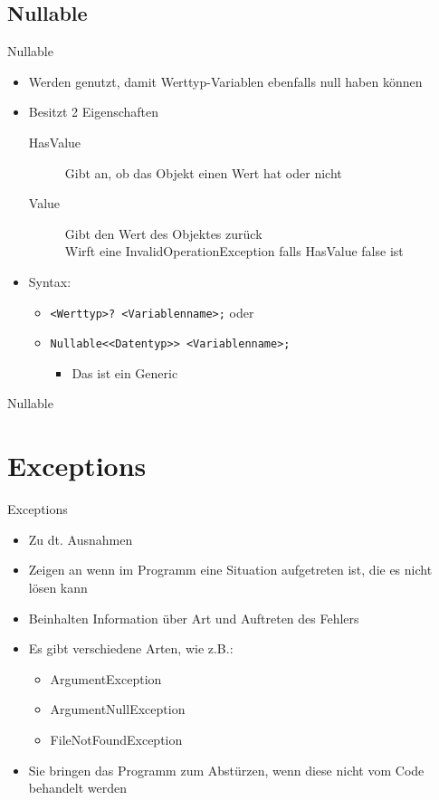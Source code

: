 \subsection{Nullable}
\begin{frame}{Nullable}
	\begin{itemize}
		\item Werden genutzt, damit Werttyp-Variablen ebenfalls \alert{null} haben können
		\item Besitzt 2 Eigenschaften
		\begin{description}
			\item[HasValue] Gibt an, ob das Objekt einen Wert hat oder nicht
			\item[Value] Gibt den Wert des Objektes zurück\\ Wirft eine InvalidOperationException falls HasValue false ist 
		\end{description}
		\item Syntax:
		\begin{itemize}
			\item \texttt{\alert{<Werttyp>}? \alert{<Variablenname>};} oder
			\item \texttt{Nullable<\alert{<Datentyp>}> \alert{<Variablenname>};}
			\begin{itemize}
				\item Das ist ein Generic
			\end{itemize}
		\end{itemize}
	\end{itemize}
\end{frame}

\begin{frame}{Nullable}
		
\end{frame}

\section{Exceptions}
\begin{frame}{Exceptions}
	\begin{itemize}
		\item Zu dt. Ausnahmen
		\item Zeigen an wenn im Programm eine Situation aufgetreten ist, die es nicht lösen kann
		\item Beinhalten Information über Art und Auftreten des Fehlers
		\item Es gibt verschiedene Arten, wie z.B.:
		\begin{itemize} 
			\item ArgumentException
			\item ArgumentNullException	
			\item FileNotFoundException
		\end{itemize}
		\item Sie bringen das Programm zum Abstürzen, wenn diese nicht vom Code behandelt werden
	\end{itemize}
\end{frame}

